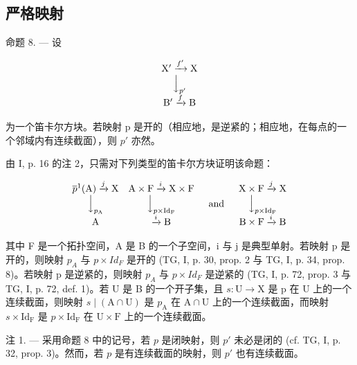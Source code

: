 \subsection{严格映射}

命题 8. --- 设

\[
\begin{array}{c} \mathrm {X^ {\prime}} \xrightarrow {f ^ {\prime}} \mathrm{X} \\ \Big \downarrow_ {p ^ {\prime}} \\ \mathrm {B^ {\prime}} \xrightarrow {f} \mathrm{B} \end{array}
\]

为一个笛卡尔方块。若映射 p 是开的（相应地，是逆紧的；相应地，在每点的一个邻域内有连续截面），则 \(p'\) 亦然。

由 I, p. 16 的注 2，只需对下列类型的笛卡尔方块证明该命题：

\[
\begin{array}{c c} \overline {{p}} ^ {1} (\mathrm {A}) \xrightarrow {j} \mathrm{X} & \mathrm {A} \times \mathrm{F} \xrightarrow {i} \mathrm{X} \times \mathrm{F} \\ \Big \downarrow_ {p _ {\mathrm {A}}} & \Big \downarrow_ {p \times \mathrm {Id}_{\mathrm {F}}} \\ \mathrm {A} & \xrightarrow {i} \mathrm {B} \end{array} \quad\text {and} \quad \begin{array}{c} \mathrm {X} \times \mathrm {F} \xrightarrow {j} \mathrm {X} \\ \Big \downarrow_ {p \times \mathrm {Id}_{\mathrm {F}}} \\ \mathrm {B} \times \mathrm {F} \xrightarrow {i} \mathrm {B} \end{array}
\]

其中 F 是一个拓扑空间，A 是 B 的一个子空间，i 与 j 是典型单射。若映射 p 是开的，则映射 \(p_{A}\) 与 \(p \times Id_{F}\) 是开的 (TG, I, p. 30, prop. 2 与 TG, I, p. 34, prop. 8)。若映射 p 是逆紧的，则映射 \(p_{A}\) 与 \(p \times Id_{F}\) 是逆紧的 (TG, I, p. 72, prop. 3 与 TG, I, p. 72, def. 1)。若 U 是 B 的一个开子集，且 \(s\colon\mathrm{U}\to\mathrm{X}\) 是 p 在 U 上的一个连续截面，则映射 \(s\mid(\mathrm{A}\cap\mathrm{U})\) 是 \(p_{\mathrm{A}}\) 在 \(\mathrm{A}\cap\mathrm{U}\) 上的一个连续截面，而映射 \(s\times\mathrm{Id}_{\mathrm{F}}\) 是 \(p\times\mathrm{Id}_{\mathrm{F}}\) 在 \(\mathrm{U}\times\mathrm{F}\) 上的一个连续截面。

注 1. --- 采用命题 8 中的记号，若 \(p\) 是闭映射，则 \(p'\) 未必是闭的 (cf. TG, I, p. 32, prop. 3)。然而，若 \(p\) 是有连续截面的映射，则 \(p'\) 也有连续截面。


